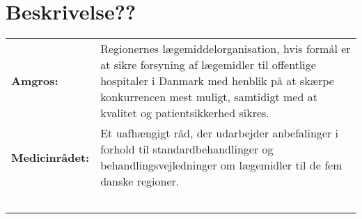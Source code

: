 \section*{Beskrivelse??}
\begin{table}[H]
\begin{tabular}{p{3cm} p{11cm}}
\textbf{Amgros:} & Regionernes lægemiddelorganisation, hvis formål er at sikre forsyning af lægemidler til offentlige hospitaler i Danmark med henblik på at skærpe konkurrencen mest muligt, samtidigt med at kvalitet og patientsikkerhed sikres. \vspace{0.5cm}
\\ 
\textbf{Medicinrådet:} & Et uafhængigt råd, der udarbejder anbefalinger i forhold til standardbehandlinger og behandlingsvejledninger om lægemidler til de fem danske regioner. \vspace{0.5cm} \\
& \vspace{0.5cm} \\
& \vspace{0.5cm} \\
& \vspace{0.5cm} \\
& \vspace{0.5cm} \\
& \vspace{0.5cm} \\
\end{tabular}
\end{table}